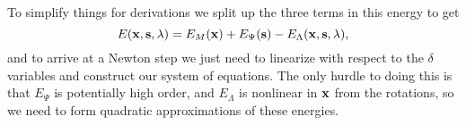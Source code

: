 To simplify things for derivations we split up the three terms in this energy to get
\begin{equation}
E(\mathbf{x}, \mathbf{s}, \mathbf{\lambda}) = E_M (\mathbf{x}) + E_\Psi (\mathbf{s}) - E_\Lambda (\mathbf{x}, \mathbf{s}, \mathbf{\lambda}),
\end{equation}
and to arrive at a Newton step we just need to linearize with respect to the $\delta$ variables and construct our system of equations. The only hurdle to doing this is that $E_\Psi$ is potentially high order, and $E_\Lambda$ is nonlinear in $\mathbf{x}$ from the rotations, so we need to form quadratic approximations of these energies.